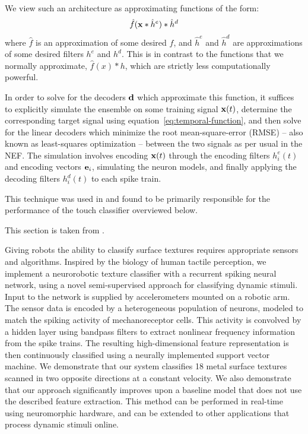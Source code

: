 We view such an architecture as approximating functions of the form:
\begin{equation} \label{eq:temporal-function}
\hat{f}(\mathbf{x} \ast \hat{h}^e) \ast \hat{h}^d
\end{equation}
where $\hat{f}$ is an approximation of some desired $f$, and $\hat{h}^e$ and $\hat{h}^d$ are approximations of some desired filters $h^e$ and $h^d$.
This is in contrast to the functions that we normally approximate, $\hat{f}(x) \ast h$, which are strictly less computationally powerful.

In order to solve for the decoders $\mathbf{d}$ which approximate this function, it suffices to explicitly simulate the ensemble on some training signal $\mathbf{x}(t)$, determine the corresponding target signal using equation~\ref{eq:temporal-function}, and then solve for the linear decoders which minimize the root mean-square-error (RMSE) -- also known as least-squares optimization -- between the two signals as per usual in the NEF.
The simulation involves encoding $\mathbf{x}(t)$ through the encoding filters $h_i^e(t)$ and encoding vectors $\mathbf{e}_i$, simulating the neuron models, and finally applying the decoding filters $h_i^d(t)$ to each spike train.

This technique was used in \citet{voelker2016a} and found to be primarily responsible for the performance of the touch classifier overviewed below.

This section is taken from \citep{voelker2016a}.

Giving robots the ability to classify surface textures requires appropriate sensors and algorithms. Inspired by the biology of human tactile perception, we implement a neurorobotic texture classifier with a recurrent spiking neural network, using a novel semi-supervised approach for classifying dynamic stimuli. Input to the network is supplied by accelerometers mounted on a robotic arm. The sensor data is encoded by a heterogeneous population of neurons, modeled to match the spiking activity of mechanoreceptor cells. This activity is convolved by a hidden layer using bandpass filters to extract nonlinear frequency information from the spike trains. The resulting high-dimensional feature representation is then continuously classified using a neurally implemented support vector machine. We demonstrate that our system classifies 18 metal surface textures scanned in two opposite directions at a constant velocity. %
We also demonstrate that our approach significantly improves upon a baseline model that does not use the described feature extraction. 
This method can be performed in real-time using neuromorphic hardware, and can be extended to other applications that process dynamic stimuli online. 

